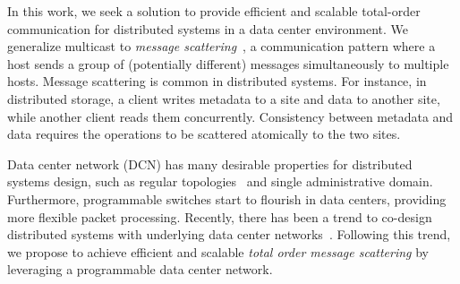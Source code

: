 In this work, we seek a solution to provide efficient and scalable total-order communication for distributed systems in a data center environment.
We generalize multicast to \textit{message scattering}~\cite{kshemkalyani2011distributed}, a communication pattern where a host sends a group of (potentially different) messages simultaneously to multiple hosts.
Message scattering is common in distributed systems.
For instance, in distributed storage, a client writes metadata to a site and data to another site, while another client reads them concurrently. Consistency between metadata and data requires the operations to be scattered atomically to the two sites.



Data center network (DCN) has many desirable properties for distributed systems design, such as regular topologies~\cite{leiserson1985fat,greenberg2009vl2} and single administrative domain.
Furthermore, programmable switches start to flourish in data centers, providing more flexible packet processing.
Recently, there has been a trend to co-design distributed systems with underlying data center networks~\cite{eris,netcache-sosp17,dang2016paxos}.
Following this trend, we propose \sys to achieve efficient and scalable \textit{total order message scattering} by leveraging a programmable data center network.


